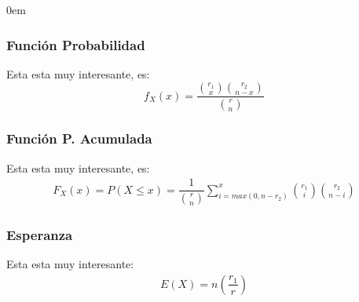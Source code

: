 \documentclass[12pt, fleqn]{report}                             %
\newenvironment{SmallIndentation}[1][0.75em]                    %
        {\begin{adjustwidth}{#1}{}\begin{footnotesize}}             %
        {\end{footnotesize}\end{adjustwidth}}                       %
\theoremstyle{break}                                            %
\newcommand{\Wrap}[1]{\left( #1 \right)}                        %
\newcommand{\pfrac}[2]{\Wrap{\dfrac{#1}{#2}}}                   %
\begin{document}
\begin{multicols}{2}
\begin{SmallIndentation}[0em]
                    \subsubsection{Función Probabilidad}

                        Esta esta muy interesante, es:
                        \begin{equation*}
                            f_X(x) = \dfrac{\binom{r_1}{x}\binom{r_2}{n - x}}{{r \choose n}}
                        \end{equation*}


                    \subsubsection{Función P. Acumulada}

                        Esta esta muy interesante, es:
                        \begin{align*}
                            F_X(x) 
                                = P(X \leq x)              
                                = \dfrac{1}{\binom{r}{n}}
                                    \displaystyle \sum_{i = max (0, n - r_2)}^x                
                                        \binom{r_1}{i} \binom{r_2}{n - i}
                        \end{align*}



                    \subsubsection{Esperanza}

                        Esta esta muy interesante:
                        \begin{align*}
                            E(X) = n \pfrac{r_1}{r}                    
                        \end{align*}



\end{SmallIndentation}
\end{multicols}
\end{document}
